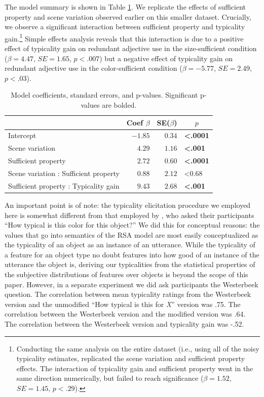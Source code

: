 \documentclass[11pt]{article}
\newcommand{\tableref}[1]{Table \ref{#1}}
\begin{document}
The model summary is shown in \tableref{tab:colortypicalityresults}. We replicate the effects of sufficient property and scene variation observed earlier on this smaller dataset. Crucially, we observe a significant interaction between sufficient property and typicality gain.\footnote{Conducting the same analysis on the entire dataset (i.e., using all of the noisy typicality estimates, replicated the scene variation and sufficient property effects. The interaction of typicality gain and sufficient property went in the same direction numerically, but failed to reach significance ($\beta = 1.52$, $SE = 1.45$, $p < .29$).} Simple effects analysis reveals that this interaction is due to a positive effect of typicality gain on redundant adjective use in the size-sufficient condition ($\beta = 4.47$, $SE = 1.65$, $p < .007$) but a negative effect of typicality gain on redundant adjective use in the color-sufficient condition  ($\beta = -5.77$, $SE = 2.49$, $p < .03$). 

\begin{table}[!tbp]
\caption{Model coefficients, standard errors, and p-values. Significant p-values are bolded.}
\begin{center}
\begin{tabular}{lrrl}
\toprule
\multicolumn{1}{l}{}&\multicolumn{1}{c}{Coef $\beta$}&\multicolumn{1}{c}{SE($\beta$)}&\multicolumn{1}{c}{$p$}\tabularnewline
\midrule
Intercept&$-1.85$&$0.34$&\textbf{\textless .0001}\tabularnewline
Scene variation&$ 4.29$&$1.16$&\textbf{\textless .001}\tabularnewline
Sufficient property&$ 2.72$&$0.60$&\textbf{\textless .0001}\tabularnewline
Scene variation : Sufficient property&$ 0.88$&$2.12$&\textless 0.68\tabularnewline
Sufficient property : Typicality gain&$ 9.43$&$2.68$&\textbf{\textless .001}\tabularnewline
\bottomrule
\end{tabular}\end{center}
\label{tab:colortypicalityresults}
\end{table}

An important point is of note: the typicality elicitation procedure we employed here is somewhat different from that employed by , who asked their participants ``How typical is this color for this object?'' We did this for conceptual reasons: the values that go into semantics of the RSA model are most easily conceptualized as the typicality of an object as an instance of an utterance. While the typicality of a feature for an object type no doubt features into how good of an instance of the utterance the object is, deriving our typicalities from the  statistical properties of the subjective distributions of features over objects is beyond the scope of this paper. However, in a separate experiment we did ask participants the Westerbeek question. The correlation between mean typicality ratings from the Westerbeek version and the unmodified ``How typical is this for \emph{X}'' version was .75. The correlation between the Westerbeek version and the modified version was .64. The correlation between the Westerbeek version and typicality gain was -.52.
\end{document}
